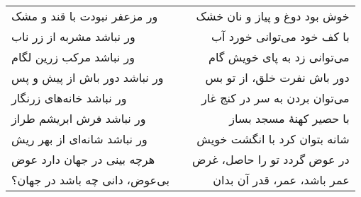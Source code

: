 \begin{center}
\begin{longtable}{l p{0.5cm} r}
\\
ور مزعفر نبودت با قند و مشک
&&
خوش بود دوغ و پیاز و نان خشک
\\
ور نباشد مشربه از زر ناب
&&
با کف خود می‌توانی خورد آب
\\
ور نباشد مرکب زرین لگام
&&
می‌توانی زد به پای خویش گام
\\
ور نباشد دور باش از پیش و پس
&&
دور باش نفرت خلق، از تو بس
\\
ور نباشد خانه‌های زرنگار
&&
می‌توان بردن به سر در کنج غار
\\
ور نباشد فرش ابریشم طراز
&&
با حصیر کهنهٔ مسجد بساز
\\
ور نباشد شانه‌ای از بهر ریش
&&
شانه بتوان کرد با انگشت خویش
\\
هرچه بینی در جهان دارد عوض
&&
در عوض گردد تو را حاصل، غرض
\\
بی‌عوض، دانی چه باشد در جهان؟
&&
عمر باشد، عمر، قدر آن بدان
\\
\end{longtable}
\end{center}
